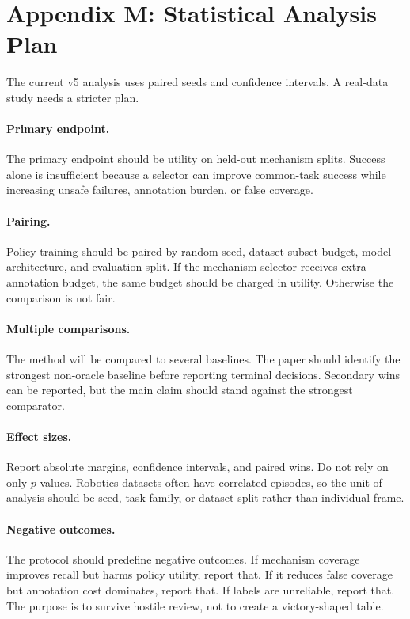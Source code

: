 \documentclass{article}
\begin{document}
\section{Appendix M: Statistical Analysis Plan}
The current v5 analysis uses paired seeds and confidence intervals. A real-data study needs a stricter plan.

\paragraph{Primary endpoint.}
The primary endpoint should be utility on held-out mechanism splits. Success alone is insufficient because a selector can improve common-task success while increasing unsafe failures, annotation burden, or false coverage.

\paragraph{Pairing.}
Policy training should be paired by random seed, dataset subset budget, model architecture, and evaluation split. If the mechanism selector receives extra annotation budget, the same budget should be charged in utility. Otherwise the comparison is not fair.

\paragraph{Multiple comparisons.}
The method will be compared to several baselines. The paper should identify the strongest non-oracle baseline before reporting terminal decisions. Secondary wins can be reported, but the main claim should stand against the strongest comparator.

\paragraph{Effect sizes.}
Report absolute margins, confidence intervals, and paired wins. Do not rely on only $p$-values. Robotics datasets often have correlated episodes, so the unit of analysis should be seed, task family, or dataset split rather than individual frame.

\paragraph{Negative outcomes.}
The protocol should predefine negative outcomes. If mechanism coverage improves recall but harms policy utility, report that. If it reduces false coverage but annotation cost dominates, report that. If labels are unreliable, report that. The purpose is to survive hostile review, not to create a victory-shaped table.
\end{document}
